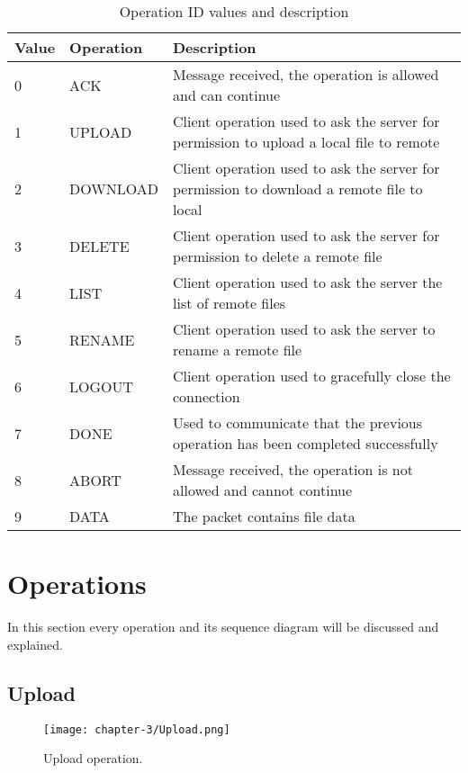 \begin{longtable}{|p{}|p{}|p{}|}
	\caption{Operation ID values and description}
	\label{Operation ID list} 
	\label{tab:operation-ids-list} \\
	\hline
	\textbf{Value} & \textbf{Operation} & \textbf{Description} \\
	\hline
	 0 & ACK & Message received, the operation is allowed and can continue \\
	\hline
	 1 & UPLOAD & Client operation used to ask the server for permission to upload a local file to remote \\
	\hline
	 2 & DOWNLOAD & Client operation used to ask the server for permission to download a remote file to local \\
	\hline
	 3 & DELETE & Client operation used to ask the server for permission to delete a remote file \\
	\hline
	 4 & LIST & Client operation used to ask the server the list of remote files  \\
	\hline
	 5 & RENAME & Client operation used to ask the server to rename a remote file \\
	\hline
	 6 & LOGOUT & Client operation used to gracefully close the connection \\
	\hline
	 7 & DONE & Used to communicate that the previous operation has been completed successfully \\
	\hline
	 8 & ABORT & Message received, the operation is not allowed and cannot continue \\
	\hline
	 9 & DATA & The packet contains file data \\
	\hline
\end{longtable}%

\section{Operations}

In this section every operation and its sequence diagram will be discussed and explained.

\subsection{Upload}

\begin{figure}[!h] 
    \centering 
    \texttt{[image: chapter-3/Upload.png]} 
    \caption{Upload operation.}
    \label{fig:upload_operation}
\end{figure}

